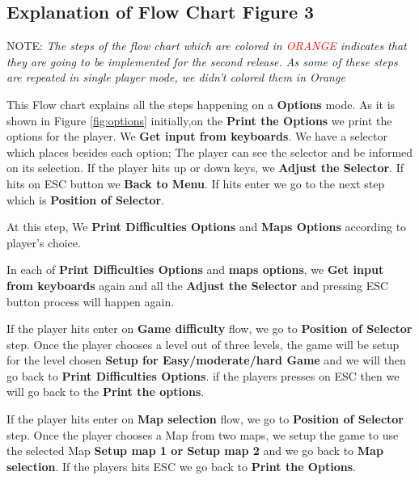 \subsection{Explanation of Flow Chart Figure 3}
NOTE:\emph{ The steps of the flow chart which are colored in  \textcolor{red}{ORANGE} indicates that they are going to be implemented for the second release. As some of these steps are repeated in single player mode, we didn't colored them in Orange}

\vspace{0.5\baselineskip} %

This Flow chart explains all the steps happening on a \textbf{Options} mode. 
As it is shown in Figure \ref{fig:options} initially,on the \textbf{Print the Options} we print the options for the player. We \textbf{Get input from keyboards}.
We have a selector which places besides each option; The player can see the selector and be informed on its selection. If the player hits up or down keys, we \textbf{Adjust the Selector}. If hits on ESC button we \textbf{Back to Menu}. If hits enter we go to the next step which is \textbf{Position of Selector}.

At this step, We \textbf{Print Difficulties Options} and \textbf{Maps Options} according to player's choice.

In each of \textbf{Print Difficulties Options} and \textbf{maps options}, we \textbf{Get input from keyboards} again and all the \textbf{Adjust the Selector} and pressing ESC button process will happen again.

If the player hits enter on \textbf{Game difficulty} flow, we go to \textbf{Position of Selector} step. Once the player chooses a level out of three levels, the game will be setup for the level chosen \textbf{Setup for Easy/moderate/hard Game} and we will then go back to \textbf{Print Difficulties Options}. if the players presses on ESC then we will go back to the \textbf{Print the options}.

If the player hits enter on \textbf{Map selection} flow, we go to \textbf{Position of Selector} step. Once the player chooses a Map from two maps, we setup the game to use the selected Map \textbf{Setup map 1 or Setup map 2} and we go back to \textbf{Map selection}.  If the players hits ESC we go back to \textbf{Print the Options}.

